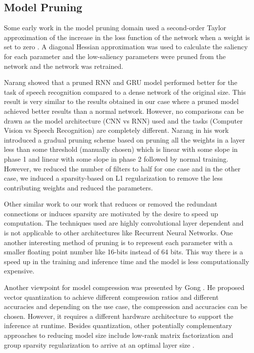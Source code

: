 \subsection{Model Pruning}

Some early work in the model pruning domain used a second-order Taylor approximation of the increase in the loss function of the network when a weight is set to zero \cite{lecun1990optimal}. A diagonal Hessian approximation was used to calculate the saliency for each parameter \cite{lecun1990optimal} and the low-saliency parameters were pruned from the network and the network was retrained.


Narang \cite{DBLP:journals/corr/NarangDSE17} showed that a pruned RNN and GRU model performed better for the task of speech recognition compared to a dense network of the original size. This result is very similar to the results obtained in our case where a pruned model achieved better results than a normal network. However, no comparisons can be drawn as the model architecture (CNN vs RNN) used and the tasks (Computer Vision vs Speech Recognition) are completely different.  Narang \cite{DBLP:journals/corr/NarangDSE17} in his work introduced a gradual pruning scheme based on pruning all the weights in a layer
less than some threshold (manually chosen) which is linear with some
slope in phase 1 and linear with some slope in phase 2 followed by
normal training. However, we reduced the number of filters to half for one case and in the other case, we induced a sparsity-based on L1 regularization to remove the less contributing weights and reduced the parameters. 


Other similar work \cite{DBLP:journals/corr/AnwarHS15, DBLP:journals/corr/LebedevGROL14, DBLP:journals/corr/ChangpinyoSZ17} to our work that reduces or removed the redundant connections or induces sparsity are motivated by the desire to speed up computation.
The techniques used are highly convolutional layer dependent and is not applicable to other architectures like Recurrent Neural Networks. 
One another interesting method of pruning is to represent each parameter with a smaller floating point number like 16-bits instead of 64 bits. This way there is a speed up in the training and inference time and the model is less computationally expensive. 

Another viewpoint for model compression was presented by Gong \cite{DBLP:journals/corr/GongLYB14}. He proposed vector quantization to achieve different compression ratios and different accuracies and depending on the use case, the compression and accuracies can be chosen. However, it requires a different hardware architecture to support the inference at runtime. Besides quantization, other potentially complementary approaches to reducing model size include low-rank matrix factorization \cite{denton2014exploiting, DBLP:journals/corr/LebedevGROL14} and group sparsity regularization to arrive at an optimal layer size \cite{DBLP:conf/nips/AlvarezS16}.

